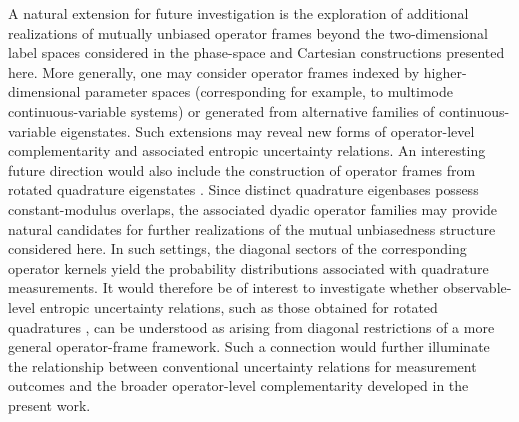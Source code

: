 \documentclass[aps,pra,onecolumn,nofootinbib,superscriptaddress,showpacs]{revtex4}
\begin{document}
A natural extension for future investigation is the exploration of additional realizations of mutually unbiased operator frames beyond the two-dimensional label spaces considered in the phase-space and Cartesian constructions presented here. More generally, one may consider operator frames indexed by higher-dimensional parameter spaces (corresponding for example, to multimode continuous-variable systems) or generated from alternative families of continuous-variable eigenstates. Such extensions may reveal new forms of operator-level complementarity and associated entropic uncertainty relations.
An interesting future direction would also include the construction of operator frames from rotated quadrature eigenstates \cite{Cerf1,Cerf2}. Since distinct quadrature eigenbases possess constant-modulus overlaps, the associated dyadic operator families may provide natural candidates for further realizations of the mutual unbiasedness structure considered here. In such settings, the diagonal sectors of the corresponding operator kernels yield the probability distributions associated with quadrature measurements. It would therefore be of interest to investigate whether observable-level entropic uncertainty relations, such as those obtained for rotated quadratures \cite{Cerf1,Cerf2}, can be understood as arising from diagonal restrictions of a more general operator-frame framework. Such a connection would further illuminate the relationship between conventional uncertainty relations for measurement outcomes and the broader operator-level complementarity developed in the present work.

\end{document}
